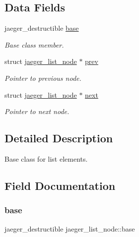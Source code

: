 \subsection*{Data Fields}
\begin{DoxyCompactItemize}
\item 
jaeger\+\_\+destructible \mbox{\hyperlink{structjaeger__list__node_aff2082a8eaa51bcb60f131401d37a549}{base}}
\begin{DoxyCompactList}\small\item\em Base class member. \end{DoxyCompactList}\item 
struct \mbox{\hyperlink{structjaeger__list__node}{jaeger\+\_\+list\+\_\+node}} $\ast$ \mbox{\hyperlink{structjaeger__list__node_a2bb6e6f98c5f2e335ed4e97c2175c78f}{prev}}
\begin{DoxyCompactList}\small\item\em Pointer to previous node. \end{DoxyCompactList}\item 
struct \mbox{\hyperlink{structjaeger__list__node}{jaeger\+\_\+list\+\_\+node}} $\ast$ \mbox{\hyperlink{structjaeger__list__node_a06dd6747b4a3001ea24a0aa33741d126}{next}}
\begin{DoxyCompactList}\small\item\em Pointer to next node. \end{DoxyCompactList}\end{DoxyCompactItemize}


\subsection{Detailed Description}
Base class for list elements. 

\subsection{Field Documentation}
\mbox{\label{structjaeger__list__node_aff2082a8eaa51bcb60f131401d37a549}} 
\subsubsection{\texorpdfstring{base}{base}}
{\footnotesize\ttfamily jaeger\+\_\+destructible jaeger\+\_\+list\+\_\+node\+::base}



